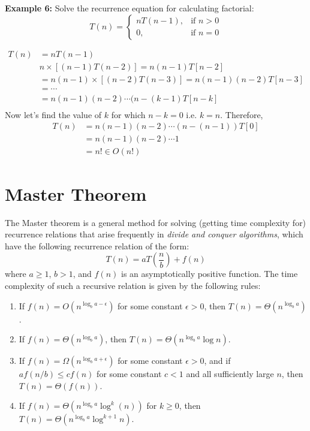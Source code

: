 \documentclass[a4paper,11pt]{book}
\begin{document}
\noindent \textbf{Example 6:} Solve the recurrence equation for calculating factorial:
\[
   T(n) = 
\begin{cases}
    nT(n-1) , & \text{if } n > 0\\
    0,                   & \text{if } n = 0
\end{cases}
\]

\begin{align*}
	T(n) &= nT(n-1) \\
	     & n \times \left[(n-1)T(n-2)\right] = n(n-1) T[n-2] \\
	     &= n(n-1) \times \left[(n-2)T(n-3)\right] = n(n-1)(n-2) T[n-3]\\
	     &= \cdots\\
	     &= n(n-1)(n-2) \cdots (n-(k-1)T[n-k]\\
\end{align*}
\noindent Now let's find the value of $k$ for which $n-k = 0$ i.e. $k=n$. Therefore,
\begin{align*}
	T(n) &= n(n-1)(n-2) \cdots (n-(n-1))T[0]\\
	     &= n(n-1)(n-2) \cdots 1\\
	     &= n! \in O(n!)
\end{align*}
\section{Master Theorem}

\noindent The Master theorem is a general method for solving (getting time complexity for) recurrence relations that arise frequently in \textit{divide and conquer algorithms}, which have the following recurrence relation of the form: 
$$T(n) = a T\left(\dfrac{n}{b}\right)+f(n)$$
\noindent where $a \ge 1$, $b > 1$, and $f(n)$ is an asymptotically positive function. The time complexity of such a recursive relation is given by the following rules:

\begin{enumerate}
\item If $f(n) = O(n^{\log_ba-\epsilon})$ for some constant
$\epsilon>0$, then $T(n) = \Theta(n^{\log_ba})$.
\item If $f(n) = \Theta(n^{\log_ba})$, then $T(n) =
\Theta(n^{\log_ba} \log n)$.
\item If $f(n) = \Omega(n^{\log_ba+\epsilon})$ for some constant $\epsilon>0$, and if $a f(n/b) \le c f(n)$ for some constant $c<1$ and all sufficiently large $n$, then $T(n) = \Theta(f(n))$.
\item If $f(n) = \Theta(n^{\log_ba} \log^k(n))$ for $k\ge 0$, then
$T(n) = \Theta(n^{\log_ba} \log^{k+1} n)$.
\end{enumerate}
\end{document}
